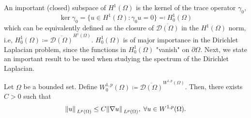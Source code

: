 An important (closed) subspace of \(H^1(\Omega)\) is the kernel of the trace operator \(\gamma_0\),
\[
    \ker \gamma_0 = \{u \in H^1(\Omega): \gamma_0 u = 0\} \eqqcolon H^1_0(\Omega)
\] 
which can be equivalently defined as the closure of \(\overline{\mathcal{D}(\Omega)}\) in the \(H^1(\Omega)\) norm, i.e,  \(H^1_0(\Omega) \coloneqq \overline{\mathcal{D}(\Omega)}^{H^1(\Omega)}\). \(H^1_0(\Omega)\) is of major importance in the Dirichlet Laplacian problem, since the functions in \(H^1_0(\Omega)\) "vanish" on \(\partial\Omega\). Next, we state an important result to be used when studying the spectrum of the Dirichlet Laplacian.
\begin{theorem}
    Let \(\Omega\) be a bounded set. Define \(W^{1, p}_0(\Omega) \coloneqq \overline{\mathcal{D}(\Omega)}^{W^{1, p}(\Omega)}\). Then, there exists \(C > 0\) such that
    \[
        \norm*{u}_{L^p(\Omega)} \leq C \norm*{\nabla u}_{L^p(\Omega)}, \; \forall u \in W^{1, p}(\Omega).
    \]
\end{theorem}

